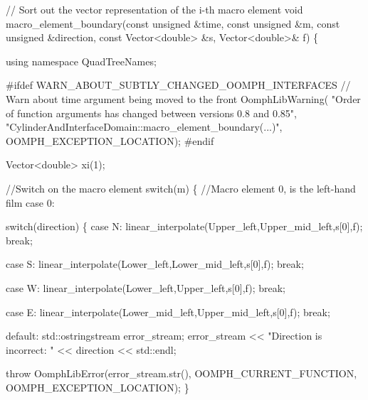 \begin{DoxyCodeInclude}
   

 \textcolor{comment}{// Sort out the vector representation of the i-th macro element}
 \textcolor{keywordtype}{void} macro\_element\_boundary(\textcolor{keyword}{const} \textcolor{keywordtype}{unsigned} &time,
                             \textcolor{keyword}{const} \textcolor{keywordtype}{unsigned} &m,
                             \textcolor{keyword}{const} \textcolor{keywordtype}{unsigned} &direction,
                             \textcolor{keyword}{const} Vector<double> &s,
                             Vector<double>& f)
 \{
 
  \textcolor{keyword}{using namespace }QuadTreeNames;

\textcolor{preprocessor}{#ifdef WARN\_ABOUT\_SUBTLY\_CHANGED\_OOMPH\_INTERFACES}
   \textcolor{comment}{// Warn about time argument being moved to the front}
   OomphLibWarning(
    \textcolor{stringliteral}{"Order of function arguments has changed between versions 0.8 and 0.85"},
    \textcolor{stringliteral}{"CylinderAndInterfaceDomain::macro\_element\_boundary(...)"},
    OOMPH\_EXCEPTION\_LOCATION);
\textcolor{preprocessor}{#endif}

  Vector<double> xi(1);  

  \textcolor{comment}{//Switch on the macro element}
  \textcolor{keywordflow}{switch}(m)
   \{
    \textcolor{comment}{//Macro element 0, is the left-hand film}
   \textcolor{keywordflow}{case} 0:
    
    \textcolor{keywordflow}{switch}(direction)
     \{
     \textcolor{keywordflow}{case} N:
      linear\_interpolate(Upper\_left,Upper\_mid\_left,s[0],f);
      \textcolor{keywordflow}{break};

     \textcolor{keywordflow}{case} S:  
       linear\_interpolate(Lower\_left,Lower\_mid\_left,s[0],f);
      \textcolor{keywordflow}{break};

     \textcolor{keywordflow}{case} W:
       linear\_interpolate(Lower\_left,Upper\_left,s[0],f);
      \textcolor{keywordflow}{break};

     \textcolor{keywordflow}{case} E:
       linear\_interpolate(Lower\_mid\_left,Upper\_mid\_left,s[0],f);
      \textcolor{keywordflow}{break};

     \textcolor{keywordflow}{default}:
      std::ostringstream error\_stream;
      error\_stream << \textcolor{stringliteral}{"Direction is incorrect: "} << direction << std::endl;

      \textcolor{keywordflow}{throw} OomphLibError(error\_stream.str(),
                          OOMPH\_CURRENT\_FUNCTION,
                          OOMPH\_EXCEPTION\_LOCATION);
     \}
    

\end{DoxyCodeInclude}
